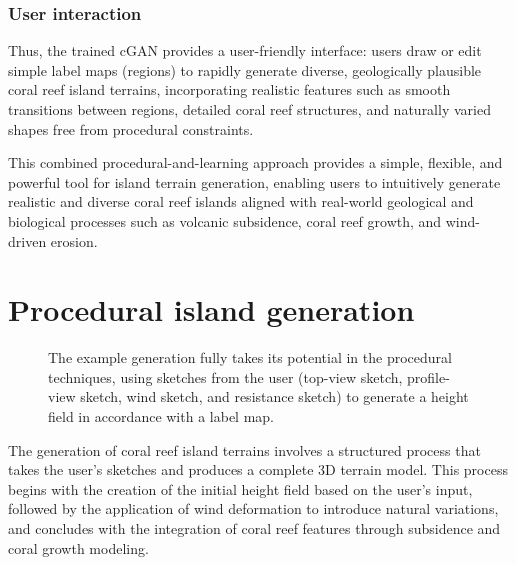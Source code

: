 \subsubsection*{User interaction}
\label{sec:coral-island_cGAN-phase-interaction}

Thus, the trained cGAN provides a user-friendly interface: users draw or edit simple label maps (regions) to rapidly generate diverse, geologically plausible coral reef island terrains, incorporating realistic features such as smooth transitions between regions, detailed coral reef structures, and naturally varied shapes free from procedural constraints.

\midConclusion

This combined procedural-and-learning approach provides a simple, flexible, and powerful tool for island terrain generation, enabling users to intuitively generate realistic and diverse coral reef islands aligned with real-world geological and biological processes such as volcanic subsidence, coral reef growth, and wind-driven erosion.






















\section{Procedural island generation}
\label{sec:coral-island_example-generation}

\begin{figure}[H]
	\centering
    \caption{The example generation fully takes its potential in the procedural techniques, using sketches from the user (top-view sketch, profile-view sketch, wind sketch, and resistance sketch) to generate a height field in accordance with a label map. }
    \label{fig:coral-island_example-pipeline}
\end{figure}

The generation of coral reef island terrains involves a structured process that takes the user's sketches and produces a complete 3D terrain model. This process begins with the creation of the initial height field based on the user's input, followed by the application of wind deformation to introduce natural variations, and concludes with the integration of coral reef features through subsidence and coral growth modeling.





